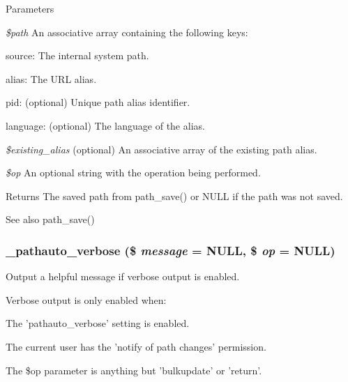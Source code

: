 \begin{DoxyParams}{Parameters}
\item[{\em \$path}]An associative array containing the following keys:
\begin{DoxyItemize}
\item source: The internal system path.
\item alias: The URL alias.
\item pid: (optional) Unique path alias identifier.
\item language: (optional) The language of the alias. 
\end{DoxyItemize}\item[{\em \$existing\_\-alias}](optional) An associative array of the existing path alias. \item[{\em \$op}]An optional string with the operation being performed.\end{DoxyParams}
\begin{DoxyReturn}{Returns}
The saved path from path\_\-save() or NULL if the path was not saved.
\end{DoxyReturn}
\begin{DoxySeeAlso}{See also}
path\_\-save() 
\end{DoxySeeAlso}
\hypertarget{pathauto_8inc_af1d110e621b254e3b2c925c824dd890a}{
\subsubsection[{\_\-pathauto\_\-verbose}]{\setlength{\rightskip}{0pt plus 5cm}\_\-pathauto\_\-verbose (\$ {\em message} = {\ttfamily NULL}, \/  \$ {\em op} = {\ttfamily NULL})}}
\label{pathauto_8inc_af1d110e621b254e3b2c925c824dd890a}
Output a helpful message if verbose output is enabled.

Verbose output is only enabled when:
\begin{DoxyItemize}
\item The 'pathauto\_\-verbose' setting is enabled.
\item The current user has the 'notify of path changes' permission.
\item The \$op parameter is anything but 'bulkupdate' or 'return'.
\end{DoxyItemize}



